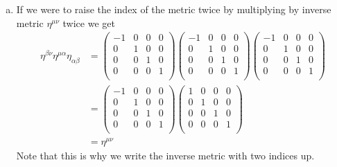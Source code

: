 \documentclass[11pt]{article}
\numberwithin{equation}{section}
\begin{document}
\begin{enumerate}[(a)]
\item
If we were to raise the index of the metric twice by multiplying by inverse metric $\eta^{\mu\nu}$ twice we get
\begin{align*}
\eta^{\beta\nu}\eta^{\mu\alpha}\eta_{\alpha\beta} &= \left(\begin{array}{cccc}
	-1 &0 &0 &0\\
	0 &1 &0 &0\\
	0 &0 &1 &0\\
	0 &0 &0 &1\\
	\end{array}\right)
	\left(\begin{array}{cccc}
	-1 &0 &0 &0\\
	0 &1 &0 &0\\
	0 &0 &1 &0\\
	0 &0 &0 &1\\
	\end{array}\right)
	\left(\begin{array}{cccc}
	-1 &0 &0 &0\\
	0 &1 &0 &0\\
	0 &0 &1 &0\\
	0 &0 &0 &1\\
	\end{array}\right)\\
&=	\left(\begin{array}{cccc}
	-1 &0 &0 &0\\
	0 &1 &0 &0\\
	0 &0 &1 &0\\
	0 &0 &0 &1\\
	\end{array}\right)
	\left(\begin{array}{cccc}
	1 &0 &0 &0\\
	0 &1 &0 &0\\
	0 &0 &1 &0\\
	0 &0 &0 &1\\
	\end{array}\right)\\
&= \eta^{\mu\nu}
\end{align*}
Note that this is why we write the inverse metric with two indices up.


\end{enumerate}
\end{document}
